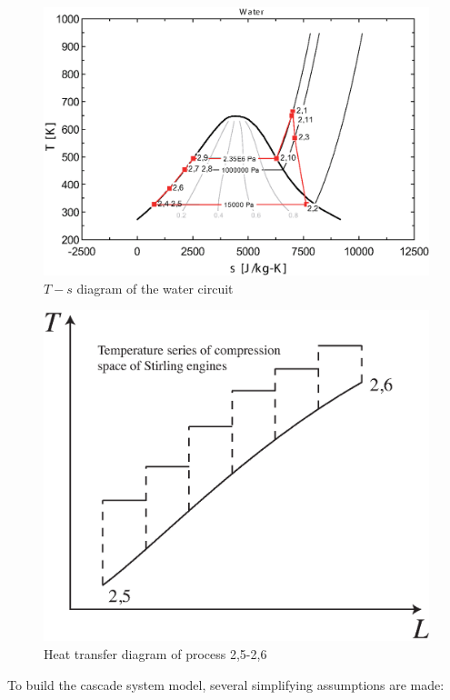 \documentclass{article}
\begin{document}
\noindent \begin{figure}[htbp]
\begin{center}
	\includegraphics[width = 0.7\columnwidth]{./graphics/T-s_Water}
	\caption{$T-s$ diagram of the water circuit}
	\label{fig:T-s_Water}
\end{center}
\end{figure}

\noindent \begin{figure}[htbp]
\begin{center}
	\includegraphics[width = 0.7\columnwidth]{./graphics/HeatTransfer_Water-SEs}
	\caption{Heat transfer diagram of process 2,5-2,6}
	\label{fig:HeatTransfer_Water-SEs}
\end{center}
\end{figure}

To build the cascade system model, several simplifying assumptions are made:
\end{document}
